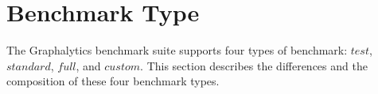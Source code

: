 \section{Benchmark Type}
\label{sec:process:type}
The Graphalytics benchmark suite supports four types of benchmark: $\textit{test}$, $\textit{standard}$, $\textit{full}$, and $\textit{custom}$. This section describes the differences and the composition of these four benchmark types.








